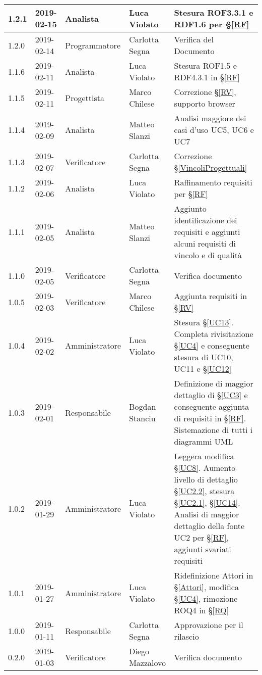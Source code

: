 \begin{center}
\begin{longtable}[C]{|m{}|m{}|m{}|m{}|p{}|}
\hline
1.2.1 & 2019-02-15 & Analista & Luca Violato & Stesura ROF3.3.1 e RDF1.6 per §\ref{RF}\\
\hline
\rowcolor{grigio} 1.2.0 & 2019-02-14 & Programmatore & Carlotta Segna & Verifica del Documento\\
\hline
1.1.6 & 2019-02-11 & Analista & Luca Violato & Stesura ROF1.5 e RDF4.3.1 in §\ref{RF}\\
\hline
\rowcolor{grigio}1.1.5 & 2019-02-11 & Progettista & Marco Chilese & Correzione §\ref{RV}, supporto browser\\
\hline
1.1.4 & 2019-02-09 & Analista & Matteo Slanzi & Analisi maggiore dei casi d'uso UC5, UC6 e UC7\\
\hline
\rowcolor{grigio} 1.1.3 & 2019-02-07 & Verificatore & Carlotta Segna & Correzione §\ref{VincoliProgettuali}\\
\hline
1.1.2 & 2019-02-06 & Analista & Luca Violato & Raffinamento requisiti per §\ref{RF}\\
\hline
\rowcolor{grigio}1.1.1 & 2019-02-05 & Analista & Matteo Slanzi & Aggiunto identificazione dei requisiti e  aggiunti alcuni requisiti di vincolo e di qualità \\
\hline
1.1.0 & 2019-02-05 & Verificatore & Carlotta Segna & Verifica documento \\
\hline
\rowcolor{grigio}1.0.5 & 2019-02-03 & Verificatore & Marco Chilese & Aggiunta requisiti in §\ref{RV}\\
\hline
1.0.4 & 2019-02-02 & Amministratore & Luca Violato & Stesura §\ref{UC13}. Completa rivisitazione §\ref{UC4} e conseguente stesura di UC10, UC11 e §\ref{UC12}\\
\hline
\rowcolor{grigio}1.0.3 & 2019-02-01 & Responsabile & Bogdan Stanciu &  Definizione di maggior dettaglio di §\ref{UC3} e conseguente aggiunta di requisiti in §\ref{RF}. Sistemazione di tutti i diagrammi UML \\
\hline
1.0.2 & 2019-01-29 & Amministratore & Luca Violato & Leggera modifica §\ref{UC8}. Aumento livello di dettaglio §\ref{UC2.2}, stesura §\ref{UC2.1}, §\ref{UC14}. Analisi di maggior dettaglio della fonte UC2 per §\ref{RF}, aggiunti svariati requisiti\\
\hline
\rowcolor{grigio}1.0.1 & 2019-01-27 & Amministratore & Luca Violato & Ridefinizione Attori in §\ref{Attori}, modifica §\ref{UC4}, rimozione ROQ4 in §\ref{RQ}\\
\hline
1.0.0 & 2019-01-11 & Responsabile & Carlotta Segna & Approvazione per il rilascio \\
\hline
\rowcolor{grigio}0.2.0 & 2019-01-03 & Verificatore & Diego Mazzalovo & Verifica documento\\

\end{longtable}
\end{center}
